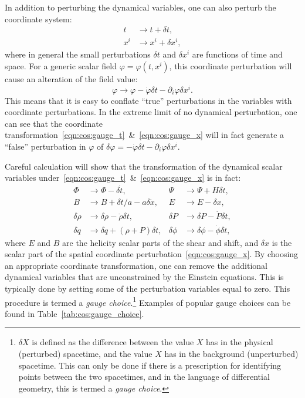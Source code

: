 In addition to perturbing the dynamical variables, one can also perturb the coordinate system:
\begin{align}
  t &\rightarrow t + \delta t,
  \label{eqn:cos:gauge_t}
  \\
  x^i &\rightarrow x^i  + \delta x^i,
  \label{eqn:cos:gauge_x}
\end{align}
where in general the small perturbations \(\delta t\) and \(\delta x^i\) are functions of time and space.
For a generic scalar field \(\varphi = \varphi(t,x^i)\), this coordinate perturbation will cause an alteration of the field value:
\begin{equation}
  \varphi \rightarrow \varphi - \dot{\varphi}\delta t - \partial_i\varphi\delta x^i.
\end{equation}
This means that it is easy to conflate ``true'' perturbations in the variables with coordinate perturbations. In the extreme limit of no dynamical perturbation, one can see that the coordinate transformation~\eqref{eqn:cos:gauge_t}~\&~\eqref{eqn:cos:gauge_x} will in fact generate a ``false'' perturbation in \(\varphi\) of \(\delta\varphi = -\dot{\varphi}\delta t - \partial_i\varphi\delta x^i\).

Careful calculation will show that the transformation of the dynamical scalar variables under~\eqref{eqn:cos:gauge_t}~\&~\eqref{eqn:cos:gauge_x} is in fact:
\begin{align}
  \Phi &\rightarrow \Phi - \delta \dot{t}, &
  \Psi &\rightarrow \Psi +H \delta t,  \nonumber\\
  B &\rightarrow B + \delta t/a - a\delta \dot{x}, &
  E &\rightarrow E - \delta x, \nonumber\\
  \delta\rho &\rightarrow \delta\rho - \dot{\rho}\delta t, &
  \delta P &\rightarrow \delta P - \dot{P}\delta t, \nonumber\\
  \delta q &\rightarrow \delta q + (\rho+P)\delta t,&
  \delta \phi &\rightarrow \delta \phi - \dot{\phi}\delta t,
\end{align}
where \(E\) and \(B\) are the helicity scalar parts of the shear and shift, and \(\delta x\) is the scalar part of the spatial coordinate perturbation~\eqref{eqn:cos:gauge_x}.
By choosing an appropriate coordinate transformation, one can remove the additional dynamical variables that are unconstrained by the Einstein equations. This is typically done by setting some of the perturbation variables equal to zero. This procedure is termed a {\em gauge choice}.\footnote{\(\delta X\) is defined as the difference between the value \(X\) has in the physical (perturbed) spacetime, and the value \(X\) has in the background (unperturbed) spacetime. This can only be done if there is a prescription for identifying points between the two spacetimes, and in the language of differential geometry, this is termed a {\em gauge choice}.}
Examples of popular gauge choices can be found in Table~\ref{tab:cos:gauge_choice}.

